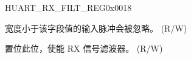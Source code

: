 \begin{register}{H}{UART\_RX\_FILT\_REG}{0x0018}\label{regdesc:UARTRXFILTREG}
%
%
%
\regnewline%
\begin{regdesc}\begin{reglist}
\label{fielddesc:UARTGLITCHFILT}\item [UART\_GLITCH\_FILT] 宽度小于该字段值的输入脉冲会被忽略。 (R/W)
\label{fielddesc:UARTGLITCHFILTEN}\item [UART\_GLITCH\_FILT\_EN] 置位此位，使能 RX 信号滤波器。 (R/W)
\end{reglist}\end{regdesc}
\end{register}


